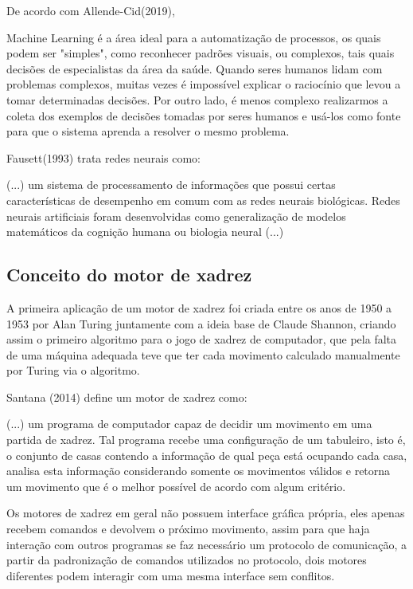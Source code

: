 De acordo com Allende-Cid(2019),
\begin{citacao}
    Machine Learning é a área ideal para a automatização de processos, os quais podem ser "simples", como reconhecer padrões visuais, ou complexos,
    tais quais decisões de especialistas da área da saúde. Quando seres humanos lidam com problemas complexos, muitas vezes é impossível explicar o raciocínio
    que levou a tomar determinadas decisões. Por outro lado, é menos complexo realizarmos a coleta dos exemplos de decisões tomadas por seres humanos e usá-los
    como fonte para que o sistema aprenda a resolver o mesmo problema.\cite[tradução dos editores, p.16.]{ALLEND-CID}
\end{citacao}

Fausett(1993) trata redes neurais como:
\begin{citacao}
    (...) um sistema de processamento de informações que possui certas características de desempenho em comum com as redes
    neurais biológicas. Redes neurais artificiais foram desenvolvidas como generalização de modelos matemáticos da cognição
    humana ou biologia neural (...) \cite[tradução nossa, p.3]{FAUSETT}
\end{citacao}

\subsection{Conceito do motor de xadrez}
A primeira aplicação de um motor de xadrez foi criada entre os anos de 1950 a 1953 por Alan Turing juntamente com a ideia base
de Claude Shannon, criando assim o primeiro algoritmo para o jogo de xadrez de computador, que pela falta de uma máquina
adequada teve que ter cada movimento calculado manualmente por Turing via o algoritmo.

Santana (2014) define um motor de xadrez como:
\begin{citacao}
    (...) um programa de computador capaz de decidir um movimento em uma partida de xadrez. Tal programa recebe uma
    configuração de um tabuleiro, isto é, o conjunto de casas contendo a informação de qual peça está ocupando cada casa,
    analisa esta informação considerando somente os movimentos válidos e retorna um movimento que é o melhor possível de
    acordo com algum critério.\cite[p.4.]{SANTANA2014}

\end{citacao}

Os motores de xadrez em geral não possuem interface gráfica própria, eles apenas recebem comandos e devolvem o próximo
movimento, assim para que haja interação com outros programas se faz necessário um protocolo de comunicação, a partir
da padronização de comandos utilizados no protocolo, dois motores diferentes podem interagir com uma mesma interface
sem conflitos.

